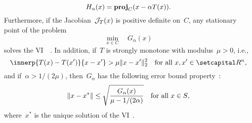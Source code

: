 \documentclass[../../main]{subfiles}
\begin{document}
\begin{example}
\begin{description}
\begin{equation}
                H_\alpha(x) = \operatorname{\mathbf{proj}}_C(x - \alpha T(x))
                .\end{equation}
            Furthermore, if the Jacobian~$\mathcal{J}_{T}(x)$ is positive definite on~$C$, any stationary point of the problem
            \begin{equation}
                \min_{x \in C} \quad G_\alpha(x)
            \end{equation}
            solves the VI~~\cite{Fukushima1992}.
            In addition, if~$T$ is strongly monotone with modulus~$\mu > 0$, i.e.,
            \begin{equation}
                \innerp{T(x) - T(x')}{x - x'} > \mu \norm{x - x'}_2^2 \forallcondition{x, x' \in \setR^n}
                ,\end{equation}
            and if~$\alpha > 1 / (2 \mu)$, then~$G_\alpha$ has the following error bound property~\cite{Taji1993}:
            \begin{equation}
                \lVert x - x^\ast\rVert \le \sqrt{\frac{G_\alpha(x)}{\mu - 1 / (2 \alpha)}} \quad \text{for all~$x \in S$}
                ,\end{equation}
            where~$x^\ast$ is the unique solution of the VI~.
    \end{description}
\end{example}
\end{document}
